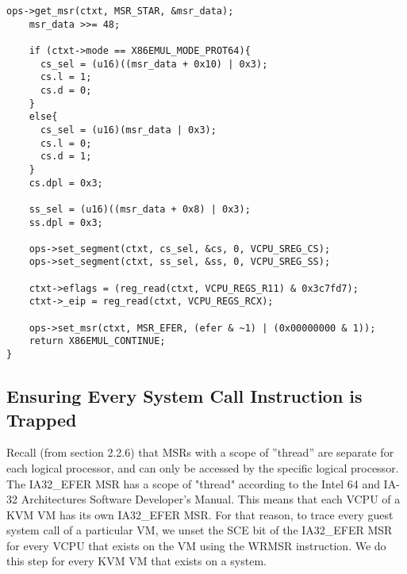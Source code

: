 \documentclass{report}
\begin{document}
\begin{spacing}{1.5}
\begin{lstlisting}[caption={Emulation of SYSRET instruction},captionpos=b]
    ops->get_msr(ctxt, MSR_STAR, &msr_data);
    msr_data >>= 48;
    
    if (ctxt->mode == X86EMUL_MODE_PROT64){
      cs_sel = (u16)((msr_data + 0x10) | 0x3);
      cs.l = 1;
      cs.d = 0;
    }
    else{
      cs_sel = (u16)(msr_data | 0x3);
      cs.l = 0;
      cs.d = 1;
    }
    cs.dpl = 0x3;
    
    ss_sel = (u16)((msr_data + 0x8) | 0x3);
    ss.dpl = 0x3;
    
    ops->set_segment(ctxt, cs_sel, &cs, 0, VCPU_SREG_CS);
    ops->set_segment(ctxt, ss_sel, &ss, 0, VCPU_SREG_SS);
    
    ctxt->eflags = (reg_read(ctxt, VCPU_REGS_R11) & 0x3c7fd7);
    ctxt->_eip = reg_read(ctxt, VCPU_REGS_RCX);
    
    ops->set_msr(ctxt, MSR_EFER, (efer & ~1) | (0x00000000 & 1));
    return X86EMUL_CONTINUE;
}
\end{lstlisting}


















\subsection{Ensuring Every System Call Instruction is Trapped}
{\large
Recall (from section 2.2.6) that MSRs with a scope of ”thread” are separate for each logical processor, and can only be accessed by the specific logical processor. The IA32\_EFER MSR has a scope of "thread" according to the Intel 64 and IA-32 Architectures Software Developer’s Manual. This means that each VCPU of a KVM VM has its own IA32\_EFER MSR. For that reason, to trace every guest system call of a particular VM, we unset the SCE bit of the IA32\_EFER MSR for every VCPU that exists on the VM using the WRMSR instruction. We do this step for every KVM VM that exists on a system.
\leavevmode\newline
}


\end{spacing}
\end{document}
